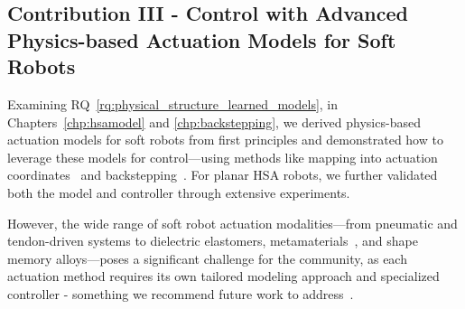 \subsection{Contribution III - Control with Advanced Physics-based Actuation Models for Soft Robots}
Examining \gls{RQ}~\ref{rq:physical_structure_learned_models}, in Chapters~\ref{chp:hsamodel} and \ref{chp:backstepping}, we derived physics-based actuation models for soft robots from first principles and demonstrated how to leverage these models for control—using methods like mapping into actuation coordinates~\citep{pustina2024input} and backstepping~\citep{khalil2002nonlinear}. For planar \gls{HSA} robots, we further validated both the model and controller through extensive experiments. 

However, the wide range of soft robot actuation modalities—from pneumatic and tendon-driven systems to dielectric elastomers, metamaterials~\citep{zaidi2021actuation}, and shape memory alloys—poses a significant challenge for the community, as each actuation method requires its own tailored modeling approach and specialized controller - something we recommend future work to address~\citep{copaci2020flexible, soleti2024nonlinear, soleti2025model}.

